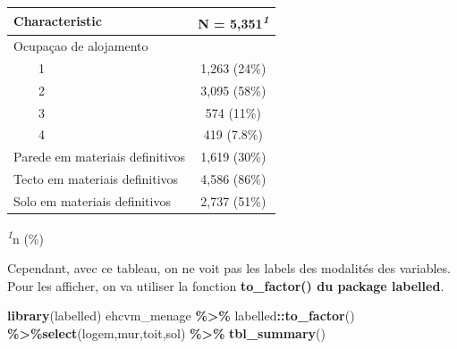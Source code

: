 \documentclass[
]{article}
\newenvironment{Shaded}{\begin{snugshade}}{\end{snugshade}}
\newcommand{\FunctionTok}[1]{\textcolor[rgb]{0.13,0.29,0.53}{\textbf{#1}}}
\newcommand{\NormalTok}[1]{#1}
\newcommand{\SpecialCharTok}[1]{\textcolor[rgb]{0.81,0.36,0.00}{\textbf{#1}}}
\begin{document}
\begin{table}[!t]
\fontsize{12.0pt}{14.4pt}\selectfont
\begin{tabular*}{\linewidth}{@{\extracolsep{\fill}}lc}
\toprule
\textbf{Characteristic} & \textbf{N = 5,351}\textsuperscript{\textit{1}} \\ 
\midrule\addlinespace[2.5pt]
Ocupaçao de alojamento &  \\ 
    1 & 1,263 (24\%) \\ 
    2 & 3,095 (58\%) \\ 
    3 & 574 (11\%) \\ 
    4 & 419 (7.8\%) \\ 
Parede em materiais definitivos & 1,619 (30\%) \\ 
Tecto em materiais definitivos & 4,586 (86\%) \\ 
Solo em materiais definitivos & 2,737 (51\%) \\ 
\bottomrule
\end{tabular*}
\begin{minipage}{\linewidth}
\textsuperscript{\textit{1}}n (\%)\\
\end{minipage}
\end{table}

Cependant, avec ce tableau, on ne voit pas les labels des modalités des
variables. Pour les afficher, on va utiliser la fonction
\textbf{to\_factor() du package labelled}.

\begin{Shaded}
\begin{Highlighting}[]
\FunctionTok{library}\NormalTok{(labelled)}
\NormalTok{ehcvm\_menage }\SpecialCharTok{\%\textgreater{}\%}\NormalTok{ labelled}\SpecialCharTok{::}\FunctionTok{to\_factor}\NormalTok{() }\SpecialCharTok{\%\textgreater{}\%}\FunctionTok{select}\NormalTok{(logem,mur,toit,sol) }\SpecialCharTok{\%\textgreater{}\%} \FunctionTok{tbl\_summary}\NormalTok{()}
\end{Highlighting}
\end{Shaded}
\end{document}

